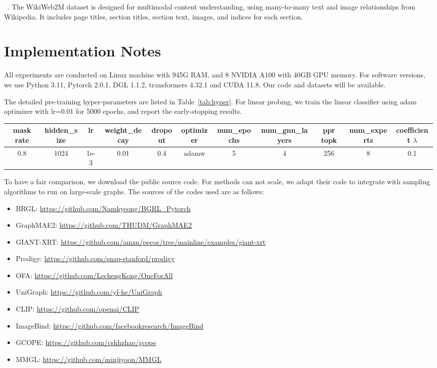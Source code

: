~\cite{burns2023suite}. The WikiWeb2M dataset is designed for multimodal content understanding, using many-to-many text and image relationships from Wikipedia. It includes page titles, section titles, section text, images, and indices for each section.

\section{Implementation Notes}
\label{appendix:imple}
All experiments are conducted on Linux machine with 945G RAM, and 8 NVIDIA A100 with 40GB GPU memory. For software versions, we use Python 3.11, Pytorch 2.0.1, DGL 1.1.2, transformers 4.32.1 and CUDA 11.8. Our code and datasets will be available.

The detailed pre-training hyper-parameters are listed in Table~\ref{tab:hyper}. 
For linear probing, we train the linear classifier using adam optimizer with lr=0.01 for 5000 epochs, and report the early-stopping results.
\begin{table*}[h] 
    \centering
    \caption{Pre-training hyper-parameters for our framework.}
    \label{tab:hyper}
    \renewcommand\tabcolsep{2.8pt}
    \begin{tabular}{ccccccccccc}
    \toprule[1.1pt]
       mask rate  & hidden\_size & lr & weight\_decay & dropout & optimizer & num\_epochs & num\_gnn\_layers & ppr topk & num\_experts & coefficient $\lambda$\\
    \midrule
      0.8  & 1024 & 1e-3 & 0.01 & 0.4 & adamw & 5 & 4 & 256 & 8 & 0.1\\
    \bottomrule[1.1pt]
    \end{tabular}
\end{table*}


To have a fair comparison, we download the public source code. For methods can not scale, we adapt their code to integrate with sampling algorithms to run on large-scale graphs. The sources of the codes used are as follows:
\begin{itemize}
    \item BRGL: \url{https://github.com/Namkyeong/BGRL\_Pytorch}
    \item GraphMAE2: \url{https://github.com/THUDM/GraphMAE2}
    \item GIANT-XRT: \url{https://github.com/amzn/pecos/tree/mainline/examples/giant-xrt}
    \item Prodigy: \url{https://github.com/snap-stanford/prodigy}
    \item OFA: \url{https://github.com/LechengKong/OneForAll}
    \item UniGraph: \url{https://github.com/yf-he/UniGraph}
    \item CLIP: \url{https://github.com/openai/CLIP}
    \item ImageBind: \url{https://github.com/facebookresearch/ImageBind}
    \item GCOPE: \url{https://github.com/cshhzhao/gcope}
    \item MMGL: \url{https://github.com/minjiyoon/MMGL}
\end{itemize}

